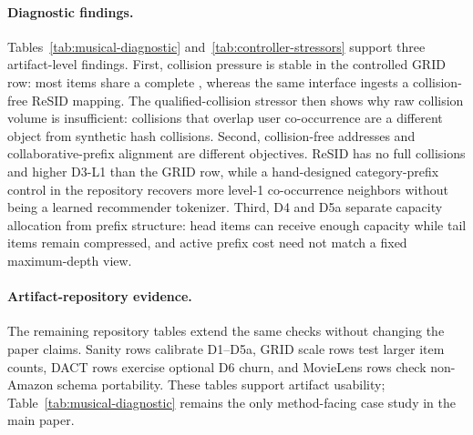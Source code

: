 \paragraph{Diagnostic findings.}
Tables~\ref{tab:musical-diagnostic} and~\ref{tab:controller-stressors} support
three artifact-level findings. First, collision pressure is stable in the
controlled GRID row: most items share a complete \sid{}, whereas the same
interface ingests a collision-free ReSID mapping. The qualified-collision
stressor then shows why raw collision volume is insufficient: collisions that
overlap user co-occurrence are a different object from synthetic hash
collisions. Second, collision-free addresses and collaborative-prefix alignment
are different objectives. ReSID has no full collisions and higher D3-L1 than
the GRID row, while a hand-designed category-prefix control in the repository
recovers more level-1 co-occurrence neighbors without being a learned
recommender tokenizer. Third, D4 and D5a separate capacity allocation from
prefix structure: head items can receive enough capacity while tail items
remain compressed, and active prefix cost need not match a fixed maximum-depth
view.

\paragraph{Artifact-repository evidence.}
The remaining repository tables extend the same checks without changing the
paper claims. Sanity rows calibrate D1--D5a, GRID scale rows test larger item
counts, DACT rows exercise optional D6 churn, and MovieLens rows check
non-Amazon schema portability. These tables support artifact usability;
Table~\ref{tab:musical-diagnostic} remains the only method-facing case study in
the main paper.
